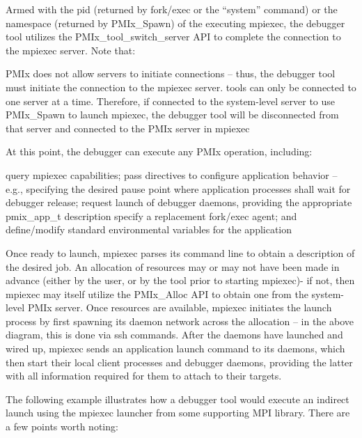 Armed with the pid (returned by fork/exec or the “system” command) or the namespace (returned by PMIx_Spawn) of the executing mpiexec, the debugger tool utilizes the PMIx_tool_switch_server API to complete the connection to the mpiexec server. Note that:

    PMIx does not allow servers to initiate connections – thus, the debugger tool must initiate the connection to the mpiexec server.
    tools can only be connected to one server at a time. Therefore, if connected to the system-level server to use PMIx_Spawn to launch mpiexec, the debugger tool will be disconnected from that server and connected to the PMIx server in mpiexec

At this point, the debugger can execute any PMIx operation, including:

    query mpiexec capabilities;
    pass directives to configure application behavior – e.g., specifying the desired pause point where application processes shall wait for debugger release;
    request launch of debugger daemons, providing the appropriate pmix_app_t description
    specify a replacement fork/exec agent; and
    define/modify standard environmental variables for the application

Once ready to launch, mpiexec parses its command line to obtain a description of the desired job. An allocation of resources may or may not have been made in advance (either by the user, or by the tool prior to starting mpiexec)- if not, then mpiexec may itself utilize the PMIx_Alloc API to obtain one from the system-level PMIx server. Once resources are available, mpiexec initiates the launch process by first spawning its daemon network across the allocation – in the above diagram, this is done via ssh commands. After the daemons have launched and wired up, mpiexec sends an application launch command to its daemons, which then start their local client processes and debugger daemons, providing the latter with all information required for them to attach to their targets.

The following example illustrates how a debugger tool would execute an indirect launch using the mpiexec launcher from some supporting MPI library. There are a few points worth noting:

